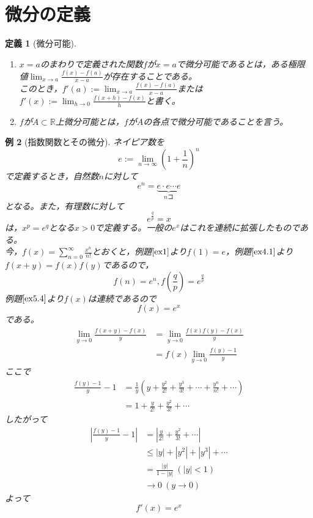 \documentclass[dvipdfmx,a4j,10pt]{jsarticle}
\theoremstyle{mystyle1}
\newtheorem{dfn}{定義}[part]
\newtheorem{example}[dfn]{例}
\theoremstyle{mystyle2}
\begin{document}
\section{微分の定義}
\begin{framed}
    \begin{dfn}[微分可能]\label{def6.1}　
        \vspace{-\baselineskip}
        \begin{enumerate}
        \item $x=a$のまわりで定義された関数$f$が$x=a$で微分可能であるとは，ある極限値$\displaystyle \lim_{x\to a}\frac{f(x)-f(a)}{x-a}$が存在することである。\\
        このとき，$\displaystyle f'(a):=\lim_{x\to a}\frac{f(x)-f(a)}{x-a}$または$\displaystyle f'(x):=\lim_{h\to 0}\frac{f(x+h)-f(x)}{h}$と書く。
        \item $f$が$A\subset\mathbb{R}$上微分可能とは，$f$が$A$の各点で微分可能であることを言う。
        \end{enumerate}
    \end{dfn}
\end{framed}

\begin{example}[指数関数とその微分]
    ネイピア数を
    \[
    e:=\lim_{n\to\infty}\left(1+\frac{1}{n}\right)^n
    \]
    で定義するとき，自然数$n$に対して
    \[
    e^n=\underbrace{e\cdot e\cdots e}_{nコ}
    \]
    となる。また，有理数に対して
    \[
    e^{\frac{q}{p}}=x
    \]
    は，$x^p=e^q$となる$x>0$で定義する。一般の$e^x$はこれを連続に拡張したものである。\\
    今，$\displaystyle f(x)=\sum_{n=0}^{\infty}\frac{x^n}{n!}$とおくと，例題$\ref{ex1}$より$f(1)=e$，例題$\ref{ex4.1}$より$f(x+y)=f(x)f(y)$であるので，
    \[
    f(n)=e^n,f\left(\frac{q}{p}\right)=e^{\frac{q}{p}}
    \]
    例題$\ref{ex5.4}$より$f(x)$は連続であるので
    \[
    f(x)=e^x
    \]
    である。
    \[
    \begin{split}
    \lim_{y \to 0}\frac{f(x+y)-f(x)}{y}&=\lim_{y\to 0}\frac{f(x)f(y)-f(x)}{y}\\
    &=f(x)\lim_{y\to 0}\frac{f(y)-1}{y}
    \end{split}
    \]
    ここで
    \[
    \begin{split}
    \frac{f(y)-1}{y}-1&=\frac{1}{y}\left(y+\frac{y^2}{2!}+\frac{y^3}{3!}+\cdots +\frac{y^n}{n!}+\cdots\right)\\
    &=1+\frac{y}{2!}+\frac{y^2}{3!}+\cdots
    \end{split}
    \]
    したがって
    \[
    \begin{split}
    \left|\frac{f(y)-1}{y}-1\right|&=\left|\frac{y}{2!}+\frac{y^2}{3!}+\cdots\right|\\
    &\leq|y|+|y^2|+|y^3|+\cdots\\
    &=\frac{|y|}{1-|y|} \ (|y|<1)\\
    &\to 0\ (y\to 0)
    \end{split}
    \]
    よって
    \[
    f'(x)=e^x
    \]
\end{example}
\end{document}
